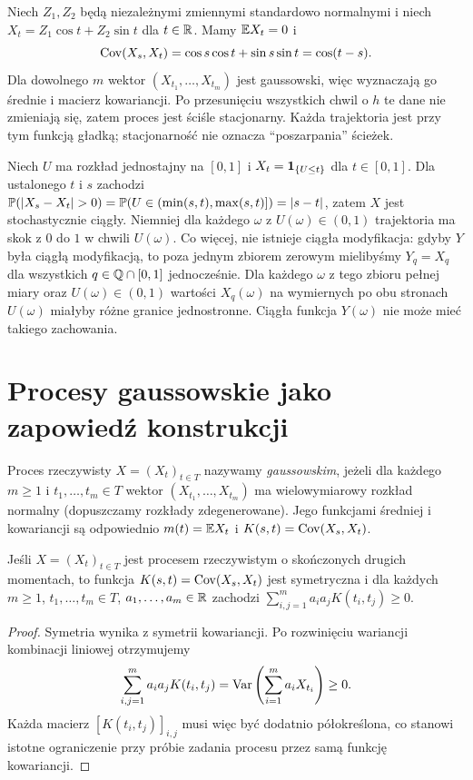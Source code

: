 \begin{przyklad}
Niech $Z_1,Z_2$ będą niezależnymi zmiennymi standardowo normalnymi
i niech $X_t=Z_1\cos t+Z_2\sin t$ dla $t\in\mathbb{R}$.
Mamy $\mathbb{E} X_t=0$ i
\[
\operatorname{Cov}(X_s,X_t)=\cos s\cos t+\sin s\sin t=\cos(t-s).
\]
Dla dowolnego $m$ wektor $(X_{t_1},\ldots,X_{t_m})$
jest gaussowski, więc wyznaczają go średnie i macierz kowariancji.
Po przesunięciu wszystkich chwil o $h$ te dane nie zmieniają się,
zatem proces jest ściśle stacjonarny. Każda trajektoria jest przy
tym funkcją gładką; stacjonarność nie oznacza ``poszarpania'' ścieżek.
\end{przyklad}

\begin{przyklad}
Niech $U$ ma rozkład jednostajny na $[0,1]$ i
$X_t=\mathbf{1}_{\{U\le t\}}$ dla $t\in[0,1]$.
Dla ustalonego $t$ i $s$ zachodzi
$\mathbb{P}(\lvert X_s-X_t\rvert>0)=\mathbb{P}(U\in(\min(s,t),\max(s,t)])
=\lvert s-t\rvert$, zatem $X$ jest stochastycznie ciągły.
Niemniej dla każdego $\omega$ z $U(\omega)\in(0,1)$
trajektoria ma skok z $0$ do $1$ w chwili $U(\omega)$.
Co więcej, nie istnieje ciągła modyfikacja: gdyby $Y$ była ciągłą
modyfikacją, to poza jednym zbiorem zerowym mielibyśmy
$Y_q=X_q$ dla wszystkich $q\in\mathbb{Q}\cap[0,1]$ jednocześnie.
Dla każdego $\omega$ z tego zbioru pełnej miary oraz
$U(\omega)\in(0,1)$ wartości $X_q(\omega)$ na wymiernych
po obu stronach $U(\omega)$ miałyby różne granice jednostronne.
Ciągła funkcja $Y(\omega)$ nie może mieć takiego zachowania.
\end{przyklad}

\section{Procesy gaussowskie jako zapowiedź konstrukcji}
\begin{definicja}
Proces rzeczywisty $X=(X_t)_{t\in T}$ nazywamy
\emph{gaussowskim}, jeżeli dla każdego $m\ge1$
i $t_1,\ldots,t_m\in T$ wektor
$(X_{t_1},\ldots,X_{t_m})$ ma wielowymiarowy rozkład
normalny (dopuszczamy rozkłady zdegenerowane).
Jego funkcjami średniej i kowariancji są odpowiednio
$m(t)=\mathbb{E} X_t$ i $K(s,t)=\operatorname{Cov}(X_s,X_t)$.
\end{definicja}

\begin{stwierdzenie}
Jeśli $X=(X_t)_{t\in T}$ jest procesem rzeczywistym o
skończonych drugich momentach, to funkcja
$K(s,t)=\operatorname{Cov}(X_s,X_t)$ jest symetryczna i dla każdych
$m\ge1$, $t_1,\ldots,t_m\in T$, $a_1,\ldots,a_m\in\mathbb{R}$
zachodzi
$\sum_{i,j=1}^m a_i a_j K(t_i,t_j)\ge0$.
\end{stwierdzenie}
\begin{proof}
Symetria wynika z symetrii kowariancji. Po rozwinięciu
wariancji kombinacji liniowej otrzymujemy
\[
\sum_{i,j=1}^m a_i a_j K(t_i,t_j)
=\operatorname{Var}\left(\sum_{i=1}^m a_i X_{t_i}\right)\ge0.
\]
Każda macierz $[K(t_i,t_j)]_{i,j}$ musi więc być dodatnio
półokreślona, co stanowi istotne ograniczenie przy próbie
zadania procesu przez samą funkcję kowariancji.
\end{proof}

